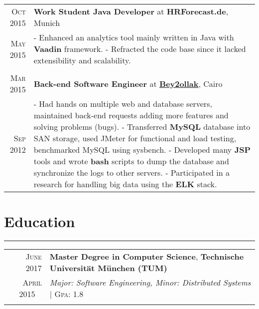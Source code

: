 \documentclass[a4paper,13pt]{article}
\begin{document}
\begin{adjustwidth}{-3cm}{}
\begin{tabular}{r|p{17.5cm}}

\textsc{Oct 2015} & \textbf{Work Student Java Developer} at \textbf{HRForecast.de}, Munich \\
\textsc{May 2015} & \footnotesize{ - Enhanced an analytics tool mainly written in Java with \textbf{Vaadin} framework. \newline
- Refracted the code base since it lacked extensibility and scalability.
} \\ 
\multicolumn{2}{c}{} \\


\textsc{Mar 2015} & \textbf{Back-end Software Engineer} at \href{http://desktop.bey2ollak.com/features-mentions/}{\textbf{Bey2ollak}}, Cairo \\
\textsc{Sep 2012} & 

\footnotesize{
	- Had hands on multiple web and database servers, maintained back-end requests adding more features and solving problems (bugs).\newline 
	- Transferred \textbf{MySQL} database into SAN storage, used JMeter for functional and load testing, benchmarked MySQL using sysbench.\newline
	- Developed many \textbf{JSP} tools and wrote \textbf{bash} scripts to dump the database and synchronize the logs to other servers.\newline
	- Participated in a research for handling big data using the \textbf{ELK} stack.
}
\end{tabular}





\section{Education}
\rule[0pt]{20cm}{0.5pt}

\begin{tabular}{r|p{17.5cm}}
		

\textsc{June 2017} & \textbf{Master Degree in Computer Science}, \textbf{Technische Universität München (TUM)} \\ \textsc{April} 2015 \
& \small\emph{Major: Software Engineering, Minor: Distributed Systems}
 \normalsize\footnotesize \hfill| \normalsize \textsc{Gpa}: 1.8
\\ \multicolumn{2}{c}{} \\


\end{tabular}
\end{adjustwidth}
\end{document}
